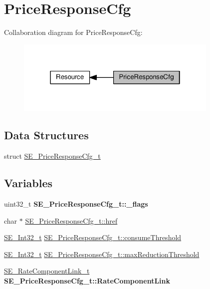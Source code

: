 \hypertarget{group__PriceResponseCfg}{}\section{Price\+Response\+Cfg}
\label{group__PriceResponseCfg}
Collaboration diagram for Price\+Response\+Cfg\+:\nopagebreak
\begin{figure}[H]
\begin{center}
\leavevmode
\includegraphics[width=274pt]{group__PriceResponseCfg}
\end{center}
\end{figure}
\subsection*{Data Structures}
\begin{DoxyCompactItemize}
\item 
struct \hyperlink{structSE__PriceResponseCfg__t}{S\+E\+\_\+\+Price\+Response\+Cfg\+\_\+t}
\end{DoxyCompactItemize}
\subsection*{Variables}
\begin{DoxyCompactItemize}
\item 
\mbox{\label{group__PriceResponseCfg_ga93edd5082de8b95b575f94e7b604f4af}} 
uint32\+\_\+t {\bfseries S\+E\+\_\+\+Price\+Response\+Cfg\+\_\+t\+::\+\_\+flags}
\item 
char $\ast$ \hyperlink{group__PriceResponseCfg_ga69527458c9f8ce19064de8c147233538}{S\+E\+\_\+\+Price\+Response\+Cfg\+\_\+t\+::href}
\item 
\hyperlink{group__Int32_gaa7afc819cfc8033c5fa408e34da8b71a}{S\+E\+\_\+\+Int32\+\_\+t} \hyperlink{group__PriceResponseCfg_gac5930323b3f189fe2f37e2b3fa3ce664}{S\+E\+\_\+\+Price\+Response\+Cfg\+\_\+t\+::consume\+Threshold}
\item 
\hyperlink{group__Int32_gaa7afc819cfc8033c5fa408e34da8b71a}{S\+E\+\_\+\+Int32\+\_\+t} \hyperlink{group__PriceResponseCfg_gac8c8682a843512f53f0a853a36604a5b}{S\+E\+\_\+\+Price\+Response\+Cfg\+\_\+t\+::max\+Reduction\+Threshold}
\item 
\mbox{\label{group__PriceResponseCfg_gaea5ed2c7658d0117adb496cf80477f6b}} 
\hyperlink{structSE__RateComponentLink__t}{S\+E\+\_\+\+Rate\+Component\+Link\+\_\+t} {\bfseries S\+E\+\_\+\+Price\+Response\+Cfg\+\_\+t\+::\+Rate\+Component\+Link}
\end{DoxyCompactItemize}


